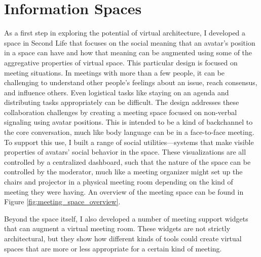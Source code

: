\section{Information Spaces}
As a first step in exploring the potential of virtual architecture, I developed a space in Second Life that focuses on the social meaning that an avatar's position in a space can have and how that meaning can be augmented using some of the aggregative properties of virtual space. \citep{Harry:2008ww} This particular design is focused on meeting situations. In meetings with more than a few people, it can be challenging to understand other people's feelings about an issue, reach consensus, and influence others. Even logistical tasks like staying on an agenda and distributing tasks appropriately can be difficult. The design addresses these collaboration challenges by creating a meeting space focused on non-verbal signaling using avatar positions. This is intended to be a kind of backchannel to the core conversation, much like body language can be in a face-to-face meeting. To support this use, I built a range of social utilities---systems that make visible properties of avatars' social behavior in the space. These visualizations are all controlled by a centralized dashboard, such that the nature of the space can be controlled by the moderator, much like a meeting organizer might set up the chairs and projector in a physical meeting room depending on the kind of meeting they were having. An overview of the meeting space can be found in  Figure \ref{fig:meeting_space_overview}.

Beyond the space itself, I also developed a number of meeting support widgets that can augment a virtual meeting room. These widgets are not strictly architectural, but they show how different kinds of tools could create virtual spaces that are more or less appropriate for a certain kind of meeting.


